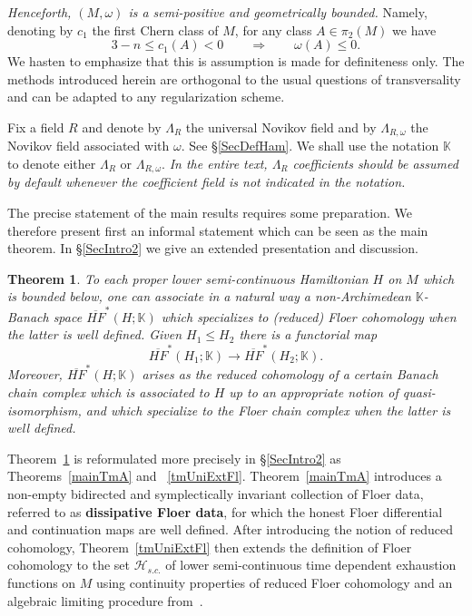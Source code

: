 \documentclass[11pt]{amsart}
\newcommand{\K}{\mathbb{K}}
\newtheorem{tm}{Theorem}[section]
\theoremstyle{definition}
\theoremstyle{remark}
\begin{document}
\textit{Henceforth, $(M,\omega)$ is a semi-positive and geometrically bounded.}  Namely, denoting by $c_1$ the first Chern class of $M$, for any class $A\in\pi_2(M)$ we have
 \[
    3-n\leq c_1(A)<0\qquad\Rightarrow \qquad \omega(A)\leq 0.
 \]
 We hasten to emphasize that this is assumption is made for definiteness only. The methods introduced herein are orthogonal to the usual questions of transversality and can be adapted to any regularization scheme.

Fix a field $R$ and denote by $\Lambda_R$ the universal Novikov field and by $\Lambda_{R,\omega}$ the Novikov field associated with $\omega$. See \S\ref{SecDefHam}. We shall use the notation $\K$ to denote either $\Lambda_R$ or $\Lambda_{R,\omega}$. \textit{In the entire text, $\Lambda_R$ coefficients should be assumed by default whenever the coefficient field is not indicated in the notation.}

The precise statement of the main results requires some preparation. We therefore present first an informal statement which can be seen as the main theorem. In \S\ref{SecIntro2} we give an extended presentation and discussion.
\begin{tm}\label{TmA}
To each proper lower semi-continuous Hamiltonian $H$ on $M$ which is bounded below, one can associate in a natural way a non-Archimedean $\K$-Banach space $\overline{HF}^*(H;\K)$ which specializes to (reduced) Floer cohomology when the latter is well defined. Given $H_1\leq H_2$ there is a functorial map
\[
\overline{HF}^*(H_1;\K)\to\overline{HF}^*(H_2;\K).
\]
Moreover, $\overline{HF}^*(H;\K)$ arises as the reduced cohomology of a certain Banach chain complex which is associated to $H$ up to an appropriate notion of quasi-isomorphism, and which specialize to the Floer chain complex when the latter is well defined.
\end{tm}
Theorem~\ref{TmA} is reformulated more precisely in \S\ref{SecIntro2} as Theorems~\ref{mainTmA} and ~\ref{tmUniExtFl}. Theorem~\ref{mainTmA} introduces a non-empty bidirected and symplectically invariant collection of Floer data, referred to as \textbf{dissipative Floer data}, for which the honest Floer differential and continuation maps are well defined. After introducing the notion of reduced cohomology, Theorem~\ref{tmUniExtFl} then extends the definition of Floer cohomology to the set $\mathcal{H}_{s.c.}$ of lower semi-continuous time dependent exhaustion functions on $M$ using continuity properties of reduced Floer cohomology and an algebraic limiting procedure from~\cite{abouzaidSeidel2010}.
\end{document}

